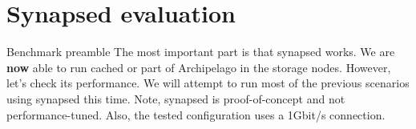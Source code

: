\section{Synapsed evaluation}

\begin{frame}{Benchmark preamble}
	The most important part is that synapsed works. We are \textbf{now} able to
	run cached or part of Archipelago in the storage nodes.
	\dspc
	However, let's check its performance.
	\spc
	We will attempt to run most of the previous scenarios using synapsed this 
	time.
	\dspc
	Note, synapsed is proof-of-concept and not performance-tuned. Also, the 
	tested configuration uses a 1Gbit/s connection.
\end{frame}

